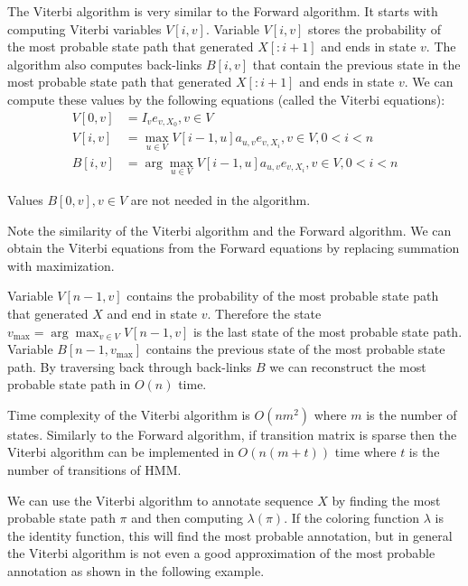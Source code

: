 The Viterbi algorithm is very similar to the  Forward algorithm. It starts with computing
Viterbi variables $V[i,v]$. Variable $V[i,v]$ stores the probability of the most probable 
state path that generated $X[:i+1]$ and ends in state $v$. The algorithm
also computes back-links $B[i,v]$ that contain the previous state in the most
probable state path that generated $X[:i+1]$ and ends in state $v$. We can
compute these values by the following equations (called the Viterbi equations):
\begin{align}
V[0,v] &= I_{v}e_{v,X_0}, v\in V\\
V[i,v] &= \max_{u\in V} V[i-1,u]a_{u,v}e_{v,X_i}, v\in V,0<i<n\\
B[i,v] &= \arg\max_{u\in V} V[i-1,u]a_{u,v}e_{v,X_i}, v\in V,0<i<n
\end{align}
\begin{note}
Values $B[0,v],v\in V$ are not needed in the algorithm.

Note the similarity of the Viterbi algorithm and the Forward algorithm.
We can obtain the Viterbi equations from the Forward equations by replacing
summation with
maximization.
\end{note}


Variable $V[n-1,v]$ contains the probability of the most probable state path
that generated $X$ and end in state $v$. Therefore the state $v_{\max} =
\arg\max_{v\in V}V[n-1,v]$ is the last state of the most probable state path.
Variable $B[n-1,v_{\max}]$ contains the previous state of the most probable
state path. By traversing back through back-links $B$ we can reconstruct the most
probable state path in $O(n)$ time.

Time complexity of the Viterbi algorithm is $O(nm^2)$ where $m$ is the number of
states. Similarly to the Forward algorithm, if transition matrix is sparse then 
the Viterbi algorithm can be implemented in $O(n(m+t))$ time where $t$ is the
number of transitions of HMM.


We can use the Viterbi algorithm to annotate sequence $X$ by finding the most
probable state path $\pi$ and then computing $\lambda(\pi)$. If the  coloring
function $\lambda$ is the identity function, this will find the most probable
annotation, but in general the Viterbi algorithm is not even a good approximation of
the most probable annotation as shown in the following example.

